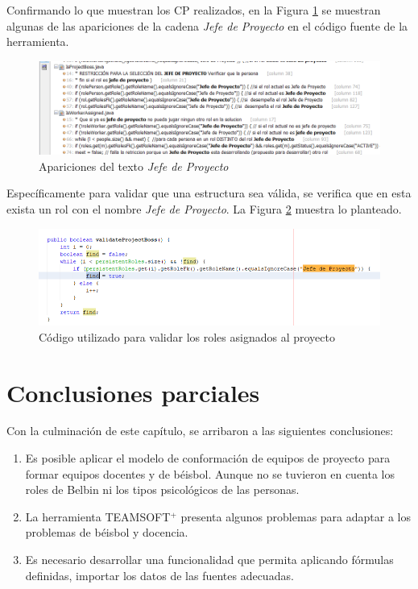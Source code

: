 Confirmando lo que muestran los CP realizados, en la Figura \ref{fig:apariciones-jefe-proy} se muestran algunas de las apariciones de la cadena \textit{Jefe de Proyecto} en el código fuente de la herramienta.


\begin{figure}[H]
	\centering
	\includegraphics[width=\textwidth]{figuras/string-texto-jefe-proy.png}
	\caption{Apariciones del texto \textit{Jefe de Proyecto}} \label{fig:apariciones-jefe-proy}
\end{figure}

Específicamente para validar que una estructura sea válida, se verifica que en esta exista un rol con el nombre \textit{Jefe de Proyecto}. La Figura \ref{fig:cod-valida} muestra lo planteado.

\begin{figure}[H]
	\centering
	\includegraphics[width=\textwidth]{figuras/validate-state.png}
	\caption{Código utilizado para validar los roles asignados al proyecto} \label{fig:cod-valida}
\end{figure}



\section{Conclusiones parciales}

Con la culminación de este capítulo, se arribaron a las siguientes conclusiones:
\begin{enumerate}
	\item Es posible aplicar el modelo de conformación de equipos de proyecto para formar equipos docentes y de béisbol. Aunque no se tuvieron en cuenta los roles de Belbin ni los tipos psicológicos de las personas.
	\item La herramienta TEAMSOFT$^+$ presenta algunos problemas para adaptar a los problemas de béisbol y docencia.
	\item Es necesario desarrollar una funcionalidad que permita aplicando fórmulas definidas, importar los datos de las fuentes adecuadas.
\end{enumerate}
